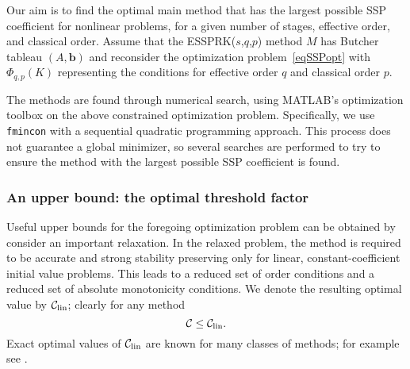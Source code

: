 Our aim is to find the optimal main method that has the largest possible
SSP coefficient for nonlinear problems, for a given number of stages, effective order,
and classical order. 
Assume that the ESSPRK(\( s \),\( q \),\( p \)) method \( M \) has Butcher tableau  \( (A, \bm{b}) \)
and reconsider the optimization problem~\eqref{eqSSPopt}
with \( \Phi_{q,p}(K) \) representing  the conditions for effective order $q$ and classical order $p$.

The methods are found through numerical search, using
\textsc{MATLAB}'s optimization toolbox on the above constrained
optimization problem.  Specifically, we use \verb"fmincon" with a
sequential quadratic programming approach.
This process does not guarantee a global minimizer, so several
searches are performed to try to ensure the method with the largest possible SSP coefficient is found.

\subsubsection{An upper bound: the optimal threshold factor}
Useful upper bounds for the foregoing optimization problem can be obtained
by consider an important relaxation.  In the relaxed problem, the method is
required to be accurate and strong stability preserving only for linear,
constant-coefficient initial value problems.  This leads to a reduced set of
order conditions and a reduced set of absolute monotonicity conditions.  We
denote the resulting optimal value by $\mathcal{C}_{\text{lin}}$; clearly for any method
$$\mathcal{C}\le\mathcal{C}_{\text{lin}}.$$
Exact optimal values of $\mathcal{C}_{\text{lin}}$ are known for many classes of methods; for example see
\cite{Kraaijevanger1986,ketcheson2009a}.



